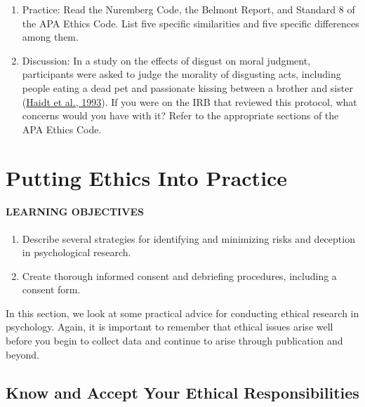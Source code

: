 \documentclass[
]{krantz}
\providecommand{\tightlist}{%
  \setlength{\itemsep}{0pt}\setlength{\parskip}{0pt}}
\begin{document}
\begin{enumerate}
\def\labelenumi{\arabic{enumi}.}
\tightlist
\item
  Practice: Read the Nuremberg Code, the Belmont Report, and Standard 8 of the APA Ethics Code. List five specific similarities and five specific differences among them.
\item
  Discussion: In a study on the effects of disgust on moral judgment, participants were asked to judge the morality of disgusting acts, including people eating a dead pet and passionate kissing between a brother and sister (\protect\hyperlink{ref-haidt1993affect}{Haidt et al., 1993}). If you were on the IRB that reviewed this protocol, what concerns would you have with it? Refer to the appropriate sections of the APA Ethics Code.
\end{enumerate}

\hypertarget{putting-ethics-into-practice}{%
\section{Putting Ethics Into Practice}\label{putting-ethics-into-practice}}

\hypertarget{learning-objectives-11}{%
\paragraph*{LEARNING OBJECTIVES}\label{learning-objectives-11}}

\begin{enumerate}
\def\labelenumi{\arabic{enumi}.}
\tightlist
\item
  Describe several strategies for identifying and minimizing risks and deception in psychological research.
\item
  Create thorough informed consent and debriefing procedures, including a consent form.
\end{enumerate}

In this section, we look at some practical advice for conducting ethical research in psychology. Again, it is important to remember that ethical issues arise well before you begin to collect data and continue to arise through publication and beyond.

\hypertarget{know-and-accept-your-ethical-responsibilities}{%
\subsection*{Know and Accept Your Ethical Responsibilities}\label{know-and-accept-your-ethical-responsibilities}}
\end{document}
